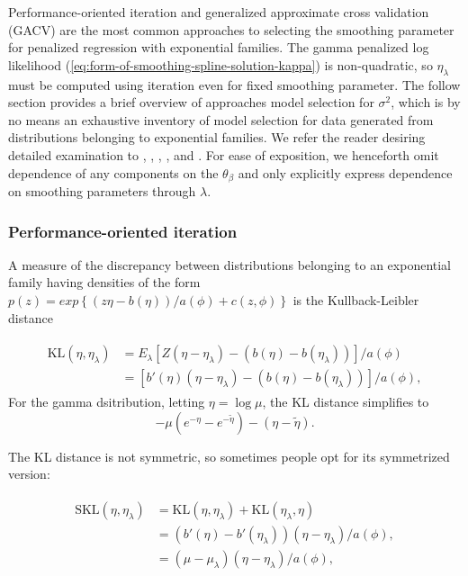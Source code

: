 Performance-oriented iteration and generalized approximate cross validation (GACV) are the most common approaches to selecting the smoothing parameter for penalized regression with exponential families. The gamma penalized log likelihood (\ref{eq:form-of-smoothing-spline-solution-kappa}) is non-quadratic, so $\eta_\lambda$ must be computed using iteration even for fixed smoothing parameter. The follow section provides a brief overview of approaches model selection for $\sigma^2$, which is by no means an exhaustive inventory of model selection for data generated from distributions belonging to exponential families. We refer the reader desiring detailed examination to \cite{zhang2006component}, \cite{xiang1996generalized}, \cite{wahba1995smoothing},  \cite{wood2004stable}, and \cite{wood2017generalized}. For ease of exposition, we henceforth omit dependence of any components on the $\theta_\beta$ and only explicitly express dependence on smoothing parameters through $\lambda$. 

\subsubsection{Performance-oriented iteration} 

A measure of the discrepancy between distributions belonging to an exponential family having densities of the form $p\left(z\right) = exp\left\{\left(z \eta - b\left(\eta\right)\right)/a\left(\phi\right) + c\left(z,\phi\right) \right\}$ is the Kullback-Leibler distance

\begin{align}
\begin{split} \label{eq:kl-distance-definition}
\mbox{KL}\left(\eta, \eta_\lambda\right) &= E_\lambda\left[Z \left(\eta - \eta_\lambda \right) - \left(b\left(\eta\right)- b\left(\eta_\lambda\right) \right)\right]/a\left(\phi\right)\\
&=\left[ b'\left(\eta\right) \left(\eta - \eta_\lambda \right) - \left(b\left(\eta\right)- b\left(\eta_\lambda\right) \right)\right]/a\left(\phi\right),
\end{split}
\end{align}
\noindent
For the gamma dsitribution, letting $\eta = \log \mu$, the KL distance simplifies to
\[
-\mu\left( e^{-\eta} - e^{-\tilde{\eta}}\right) - \left(\eta-\tilde{\eta}\right).
\]

\noindent
The KL distance is not symmetric, so sometimes people opt for its symmetrized version:

\begin{align}
\begin{split} \label{eq:skl-distance-definition}
\mbox{SKL}\left(\eta, \eta_\lambda\right) &= \mbox{KL}\left(\eta, \eta_\lambda\right) + \mbox{KL}\left(\eta_\lambda, \eta \right)\\
&= \left(b'\left(\eta\right) - b'\left(\eta_\lambda\right) \right)\left( \eta - \eta_\lambda\right)/a\left(\phi\right), \\
&= \left(\mu - \mu_\lambda \right)\left( \eta - \eta_\lambda\right)/a\left(\phi\right),
\end{split}
\end{align}


